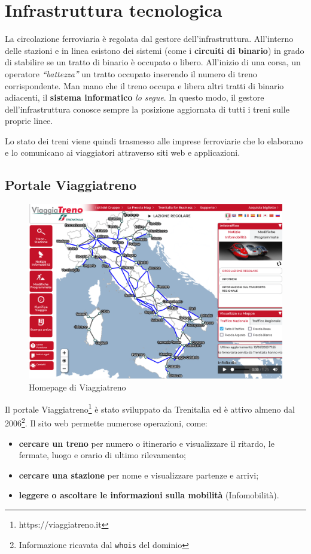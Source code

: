 \documentclass[12pt,a4paper,italian]{report}
\begin{document}
\section{Infrastruttura tecnologica}
\label{infrastruttura_tecnologica}

La circolazione ferroviaria è regolata dal gestore
dell'infrastruttura.  All'interno delle stazioni e in linea esistono
dei sistemi (come i \textbf{circuiti di binario}) in grado di
stabilire se un tratto di binario è occupato o libero.  All'inizio di
una corsa, un operatore \textit{``battezza''} un tratto occupato
inserendo il numero di treno corrispondente.  Man mano che il treno
occupa e libera altri tratti di binario adiacenti, il \textbf{sistema
    informatico} \textit{lo segue}.  In questo modo, il gestore
dell'infrastruttura conosce sempre la posizione aggiornata di tutti i
treni sulle proprie linee.

Lo stato dei treni viene quindi trasmesso alle imprese ferroviarie che
lo elaborano e lo comunicano ai viaggiatori attraverso siti web e
applicazioni.

\subsection{Portale Viaggiatreno}
\label{viaggiatreno}

\begin{figure}[h] \centering
    \includegraphics[width=1\textwidth]{images/viaggiatreno.png}
	\caption{Homepage di Viaggiatreno}
\end{figure}

Il portale Viaggiatreno\footnote{https://viaggiatreno.it} è stato
sviluppato da Trenitalia ed è attivo almeno dal
2006\footnote{Informazione ricavata dal \texttt{whois} del dominio}.
Il sito web permette numerose operazioni, come:
\begin{itemize}
	\item \textbf{cercare un treno} per numero o itinerario e
    visualizzare il ritardo, le fermate, luogo e orario di ultimo
    rilevamento;
	\item \textbf{cercare una stazione} per nome e visualizzare
    partenze e arrivi;
	\item \textbf{leggere o ascoltare le informazioni sulla mobilità}
    (Infomobilità).
\end{itemize}
\end{document}
